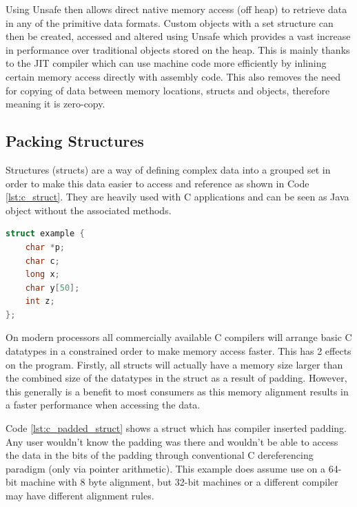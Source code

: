 \documentclass[final_report.tex]{subfiles}
\begin{document}
Using Unsafe then allows direct native memory access (off heap) to retrieve data in any of the primitive data formats. Custom objects with a set structure can then be created, accessed and altered using Unsafe which provides a vast increase in performance over traditional objects stored on the heap. This is mainly thanks to the JIT compiler which can use machine code more efficiently by inlining certain memory access directly with assembly code. This also removes the need for copying of data between memory locations, structs and objects, therefore meaning it is zero-copy.

\subsection{Packing Structures}
Structures (structs) are a way of defining complex data into a grouped set in order to make this data easier to access and reference as shown in Code \ref{lst:c_struct}. They are heavily used with C applications and can be seen as Java object without the associated methods.

\begin{lstlisting}[language=C, caption={Example C Struct}, label=lst:c_struct]
struct example {
    char *p;
    char c;
    long x;
    char y[50];
    int z;
};
\end{lstlisting}

On modern processors all commercially available C compilers will arrange basic C datatypes in a constrained order to make memory access faster. This has 2 effects on the program. Firstly, all structs will actually have a memory size larger than the combined size of the datatypes in the struct as a result of padding. However, this generally is a benefit to most consumers as this memory alignment results in a faster performance when accessing the data.


Code \ref{lst:c_padded_struct} shows a struct which has compiler inserted padding. Any user wouldn't know the padding was there and wouldn't be able to access the data in the bits of the padding through conventional C dereferencing paradigm (only via pointer arithmetic). This example does assume use on a 64-bit machine with 8 byte alignment, but 32-bit machines or a different compiler may have different alignment rules.
\end{document}
